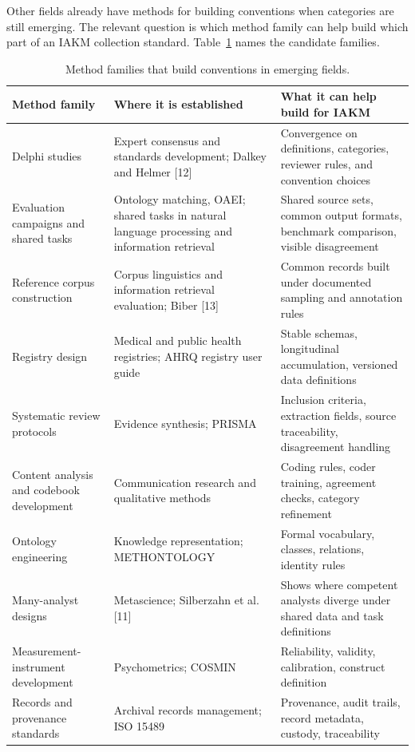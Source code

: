 \documentclass[conference]{IEEEtran}
\begin{document}
Other fields already have methods for building conventions when categories are still emerging. The relevant question is which method family can help build which part of an IAKM collection standard. Table~\ref{tab:families} names the candidate families.

\begin{table}[!tb]
\caption{Method families that build conventions in emerging fields.}
\label{tab:families}
\centering
\scriptsize
\begin{tabularx}{\textwidth}{XXX}
\hline
\textbf{Method family} & \textbf{Where it is established} & \textbf{What it can help build for IAKM} \\
\hline
Delphi studies & Expert consensus and standards development; Dalkey and Helmer [12] & Convergence on definitions, categories, reviewer rules, and convention choices \\
Evaluation campaigns and shared tasks & Ontology matching, OAEI; shared tasks in natural language processing and information retrieval & Shared source sets, common output formats, benchmark comparison, visible disagreement \\
Reference corpus construction & Corpus linguistics and information retrieval evaluation; Biber [13] & Common records built under documented sampling and annotation rules \\
Registry design & Medical and public health registries; AHRQ registry user guide & Stable schemas, longitudinal accumulation, versioned data definitions \\
Systematic review protocols & Evidence synthesis; PRISMA & Inclusion criteria, extraction fields, source traceability, disagreement handling \\
Content analysis and codebook development & Communication research and qualitative methods & Coding rules, coder training, agreement checks, category refinement \\
Ontology engineering & Knowledge representation; METHONTOLOGY & Formal vocabulary, classes, relations, identity rules \\
Many-analyst designs & Metascience; Silberzahn et al. [11] & Shows where competent analysts diverge under shared data and task definitions \\
Measurement-instrument development & Psychometrics; COSMIN & Reliability, validity, calibration, construct definition \\
Records and provenance standards & Archival records management; ISO 15489 & Provenance, audit trails, record metadata, custody, traceability \\
\hline
\end{tabularx}
\end{table}
\end{document}
